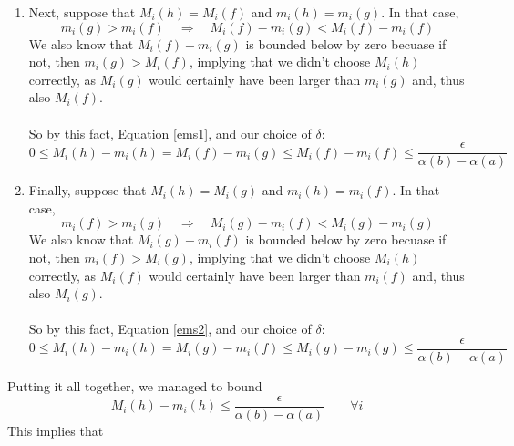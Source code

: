 \documentclass[12pt]{article}
\theoremstyle{plain}
\theoremstyle{definition}
\theoremstyle{remark}
\begin{document}
\begin{enumerate}
\begin{enumerate}
\begin{enumerate}
                \item Next, suppose that $M_i(h) = M_i(f)$ and
                    $m_i(h) = m_i(g)$. In that case, 
                        \[ m_i(g) > m_i(f) \quad
                           \Rightarrow \quad 
                           M_i(f) - m_i(g) < M_i(f) - m_i(f) \]
                    We also know that $M_i(f) - m_i(g)$ is 
                    bounded below by zero becuase if not, then
                    $m_i(g)>M_i(f)$, implying that  we didn't   
                    choose $M_i(h)$
                    correctly, as $M_i(g)$ would certainly
                    have been larger than $m_i(g)$ and, thus also
                    $M_i(f)$.
                    \\
                    \\
                    So by this fact, Equation \ref{ems1}, and our
                    choice of $\delta$:
                    \[ 0 \leq M_i(h) - m_i(h) 
                        =  M_i(f) - m_i(g)  \leq
                        M_i(f) - m_i(f) 
                        \leq\frac{\epsilon}{\alpha(b)-\alpha(a)}
                        \]
                \item Finally, suppose that $M_i(h) = M_i(g)$ and
                    $m_i(h) = m_i(f)$. In that case, 
                        \[ m_i(f) > m_i(g) \quad
                           \Rightarrow \quad 
                           M_i(g) - m_i(f) < M_i(g) - m_i(g) \]
                    We also know that $M_i(g) - m_i(f)$ is 
                    bounded below by zero becuase if not, then
                    $m_i(f)>M_i(g)$, implying that  we didn't   
                    choose $M_i(h)$
                    correctly, as $M_i(f)$ would certainly
                    have been larger than $m_i(f)$ and, thus also
                    $M_i(g)$.
                    \\
                    \\
                    So by this fact, Equation \ref{ems2}, and our
                    choice of $\delta$:
                    \[ 0 \leq M_i(h) - m_i(h) 
                        =  M_i(g) - m_i(f)  \leq
                        M_i(g) - m_i(g) 
                        \leq\frac{\epsilon}{\alpha(b)-\alpha(a)}
                        \]
            \end{enumerate}
            Putting it all together, we managed to bound
                \[ M_i(h) - m_i(h) 
                    \leq\frac{\epsilon}{\alpha(b)-\alpha(a)}
                    \qquad \forall i \]
            This implies that 

\end{enumerate}
\end{enumerate}
\end{document}
